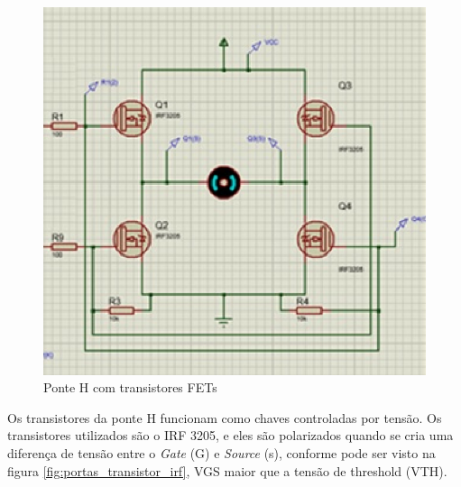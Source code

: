 \begin{figure}[!htb]
	\centering
	\includegraphics[keepaspectratio=true,scale=1]{figuras/referencialteorico/figurax_1.eps}
	\caption{Ponte H com transistores FETs}
	\label{fig:ponteh_fets}
\end{figure}

Os transistores da ponte H funcionam como chaves controladas por tensão. Os transistores utilizados são o IRF 3205, e eles são polarizados quando se cria uma diferença de tensão entre o \textit{Gate} (G) e \textit{Source} (s), conforme pode ser visto na figura \ref{fig:portas_transistor_irf}, VGS maior que a tensão de threshold (VTH).

